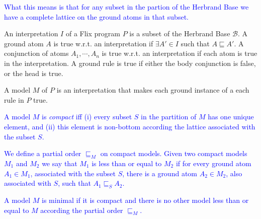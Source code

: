 \documentclass[10pt,twocolumn]{article}
\begin{document}
\textcolor{blue}{
What this means is that for any subset in the partion of the Herbrand Base we have a complete lattice on the ground atoms in that subset.
}

An interpretation $I$ of a Flix program $P$ is a subset of the Herbrand Base $\mathcal{B}$.
A ground atom $A$ is true w.r.t. an interpretation if $\exists A' \in I$ such that $A \sqsubseteq A'$. 
A conjunction of atoms $A_1, \cdots, A_n$ is true w.r.t. an interpretation if each atom is true in the interpretation.
A ground rule is true if either the body conjunction is false, or the head is true.

A model $M$ of $P$ is an interpretation that makes each ground instance of a each rule in $P$ true.

\textcolor{blue}{
A model $M$ is \emph{compact} iff
(i) every subset $S$ in the partition of $M$ has one unique element, and 
(ii) this element is non-bottom according the lattice associated with the subset $S$.
}

\textcolor{blue}{
We define a partial order $\sqsubseteq_M$ on compact models. 
Given two compact models $M_1$ and $M_2$ we say that 
$M_1$ is less than or equal to $M_2$ if for every ground atom $A_1 \in M_1$, associated with the subset $S$,
there is a ground atom $A_2 \in M_2$, also associated with $S$, such that $A_1 \sqsubseteq_S A_2$.
}

\textcolor{blue}{
A model $M$ is minimal if it is compact and there is no other model 
less than or equal to $M$ according the partial order $\sqsubseteq_M$.
}
\end{document}
